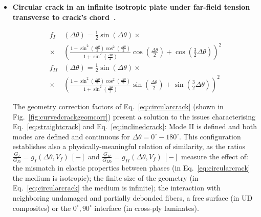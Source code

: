 \documentclass[a4paper,fleqn]{cas-dc}
\begin{document}
\begin{itemize}
\item \textbf{Circular crack in an infinite isotropic plate under far-field tension transverse to crack's chord~\cite{Ioakmidis1977}.}

\begin{equation}\label{eq:circularcrack}
\begin{aligned}
f_{I}&\left(\Delta\theta\right)=\frac{1}{2}\sin\left(\Delta\theta\right)\times\\\times&\left(\frac{1-\sin^{2}\left(\frac{\Delta\theta}{2}\right)\cos^{2}\left(\frac{\Delta\theta}{2}\right)}{1+\sin^{2}\left(\frac{\Delta\theta}{2}\right)}\cos\left(\frac{\Delta\theta}{2}\right)+\cos\left(\frac{3}{2}\Delta\theta\right)\right)^{2}\\
 f_{II}&\left(\Delta\theta\right)=\frac{1}{2}\sin\left(\Delta\theta\right)\times\\\times&\left(\frac{1-\sin^{2}\left(\frac{\Delta\theta}{2}\right)\cos^{2}\left(\frac{\Delta\theta}{2}\right)}{1+\sin^{2}\left(\frac{\Delta\theta}{2}\right)}\sin\left(\frac{\Delta\theta}{2}\right)+\sin\left(\frac{3}{2}\Delta\theta\right)\right)^{2}
\end{aligned}
\end{equation}

The geometry correction factors of Eq.~\ref{eq:circularcrack} (shown in Fig.~\ref{fig:curvedcrackgeomcorr}) present a solution to the issues characterising Eq.~\ref{eq:straightcrack} and Eq.~\ref{eq:inclinedcrack}: Mode II is defined and both modes are defined and continuous for $\Delta\theta=0^{\circ}-180^{\circ}$. This configuration establishes also a physically-meaningful relation of similarity, as the ratios $\frac{G_{I}}{G_{I0}}=g_{I}\left(\Delta\theta,V_{f}\right)\ \left[-\right]$ and $\frac{G_{II}}{G_{II0}}=g_{II}\left(\Delta\theta,V_{f}\right)\ \left[-\right]$ measure the effect of: the mismatch in elastic properties between phases (in Eq.~\ref{eq:circularcrack} the medium is isotropic); the finite size of the geometry (in Eq.~\ref{eq:circularcrack} the medium is infinite); the interaction with neighboring undamaged and partially debonded fibers, a free surface (in UD composites) or the $0^{\circ},90^{\circ}$ interface (in cross-ply laminates).

\end{itemize}
\end{document}
